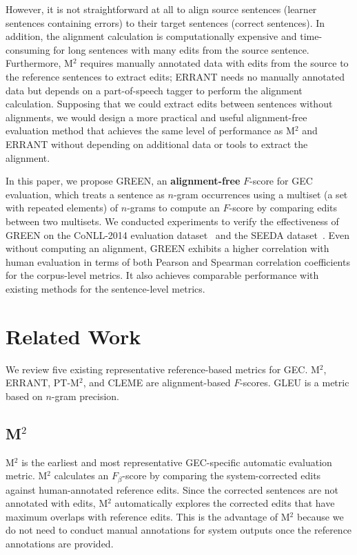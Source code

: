 \documentclass[11pt]{article}
\begin{document}
However, it is not straightforward at all to align source sentences (learner sentences containing errors) to their target sentences (correct sentences). 
In addition, the alignment calculation is computationally expensive and time-consuming for long sentences with many edits from the source sentence.
Furthermore, M${}^2$ requires manually annotated data with edits from the source to the reference sentences to extract edits; ERRANT needs no manually annotated data but depends on a part-of-speech tagger to perform the alignment calculation.
Supposing that we could extract edits between sentences without alignments, we would design a more practical and useful alignment-free evaluation method that achieves the same level of performance as M${}^2$ and ERRANT without depending on additional data or tools to extract the alignment.

In this paper, we propose GREEN, an \textbf{alignment-free} $F$-score for GEC evaluation, which treats a sentence as $n$-gram occurrences using a multiset (a set with repeated elements) of $n$-grams to compute an $F$-score by comparing edits between two multisets.
We conducted experiments to verify the effectiveness of GREEN on the CoNLL-2014 evaluation dataset~\citep{grundkiewicz-etal-2015-human} and the SEEDA dataset~\citep{10.1162/tacl_a_00676}.
Even without computing an alignment, GREEN exhibits a higher correlation with human evaluation in terms of both Pearson and Spearman correlation coefficients for the corpus-level metrics. It also achieves comparable performance with existing methods for the sentence-level metrics.

\section{Related Work}
\label{sec:related_work}

We review five existing representative reference-based metrics for GEC.
M${}^2$, ERRANT, PT-M${}^2$, and CLEME are alignment-based $F$-scores.
GLEU is a metric based on $n$-gram precision.

\subsection{M${}^2$~\citep{dahlmeier-ng-2012-better}}
\label{sec:m2}

M${}^2$ is the earliest and most representative GEC-specific automatic evaluation metric.
M${}^2$ calculates an $F_{\beta}$-score by comparing the system-corrected edits against human-annotated reference edits.
Since the corrected sentences are not annotated with edits, M${}^2$ automatically explores the corrected edits that have maximum overlaps with reference edits.
This is the advantage of M${}^2$ because we do not need to conduct manual annotations for system outputs once the reference annotations are provided.
\end{document}
